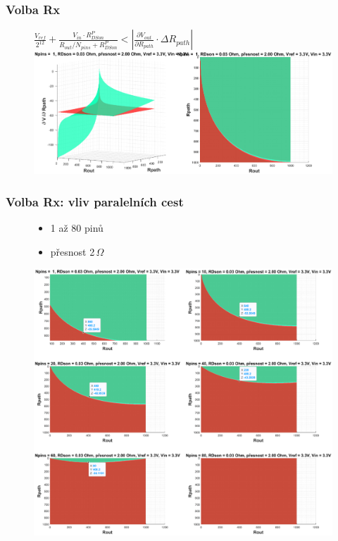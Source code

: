 \documentclass[%
  12pt,       				%
	t,                  %
	aspectratio=1610,   %
	unicode,						%
]{beamer}				    	%
\begin{document}
\begin{frame} 
	\frametitle{Volba Rx}
	\begin{figure}[ht!]

$\frac{V_{ref}}{2^{12}} + \frac{V_{in} \cdot R^P_{DSon}}{R_{out}/N_{pins} + R^P_{DSon}} < \left| \frac{\partial V_{out} }{\partial R_{path}}\cdot \Delta R_{path} \right|$
		\includegraphics[height = 0.6\textheight]{obrazky/general_dVF.eps}
	\end{figure}
\end{frame}

\begin{frame} 
	\frametitle{Volba Rx: vliv paralelních cest}
	\begin{figure}[ht!]
		\centering
		\begin{minipage}{0.3\textwidth}
			\begin{itemize}
				\item 1 až 80 pinů
				\item přesnost 2\,$\Omega$
			\end{itemize}
		\end{minipage}
		\begin{minipage}{0.65\textwidth}
		\includegraphics[height = 0.8\textheight]{obrazky/PASS_FAIL_MERENI.eps}
		\end{minipage}
	\end{figure}
\end{frame}
\end{document}
